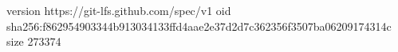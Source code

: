 version https://git-lfs.github.com/spec/v1
oid sha256:f862954903344b913034133ffd4aae2e37d2d7c362356f3507ba06209174314c
size 273374
